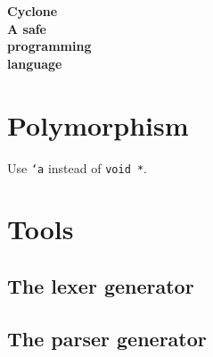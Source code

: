 \newif\ifpdf
\ifx\pdfoutput\undefined
  \pdffalse               %
\else
  \pdftrue
\fi

\usepackage{alltt}

\usepackage{makeidx}
\makeindex
\usepackage{color}
\usepackage{palatino}
\usepackage[colorlinks=true,linkcolor=bluegray,anchorcolor=bluegray,
citecolor=bluegray,filecolor=bluegray,menucolor=bluegray,pagecolor=bluegray,
urlcolor=bluegray]{hyperref}

\ifscreen
\pagecolor{lightgray}
\setlength\paperheight{6in}
\setlength\paperwidth{8in}
\setlength\oddsidemargin{-.5in}
\setlength\textwidth{7in}
\setlength\topmargin{-1in}
\setlength\textheight{5in}
\ifpdf
\pdfpageheight=6in
\pdfpagewidth=8in
\fi %
\fi %

\usepackage{underscore}

\newcommand{\bs}{\texttt{\char`\\}}
\newcommand{\lb}{\texttt{\char`\{}}
\newcommand{\rb}{\texttt{\char`\}}}


\thispagestyle{empty}
\textcolor{bluegray}{
\begin{center}
  \bfseries\fontsize{.7in}{.8in}\selectfont
  {\fontsize{1.5in}{1.6in}\selectfont Cyclone}\\[1ex]
  A safe\\
  programming\\
  language
\end{center}
}
\newpage
\tableofcontents
\newpage







\section{Polymorphism}
\hypertarget{polymorphism}{}

Use \texttt{`a} instead of \texttt{void *}.




\appendix





\section{Tools}

\subsection{The lexer generator}
\subsection{The parser generator}

\printindex



